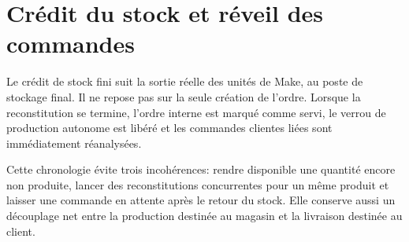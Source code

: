 \section{Crédit du stock et réveil des commandes}

Le crédit de stock fini suit la sortie réelle des unités de Make, au poste de stockage final. Il ne repose pas sur la seule création de l'ordre. Lorsque la reconstitution se termine, l'ordre interne est marqué comme servi, le verrou de production autonome est libéré et les commandes clientes liées sont immédiatement réanalysées.

Cette chronologie évite trois incohérences: rendre disponible une quantité encore non produite, lancer des reconstitutions concurrentes pour un même produit et laisser une commande en attente après le retour du stock. Elle conserve aussi un découplage net entre la production destinée au magasin et la livraison destinée au client.

